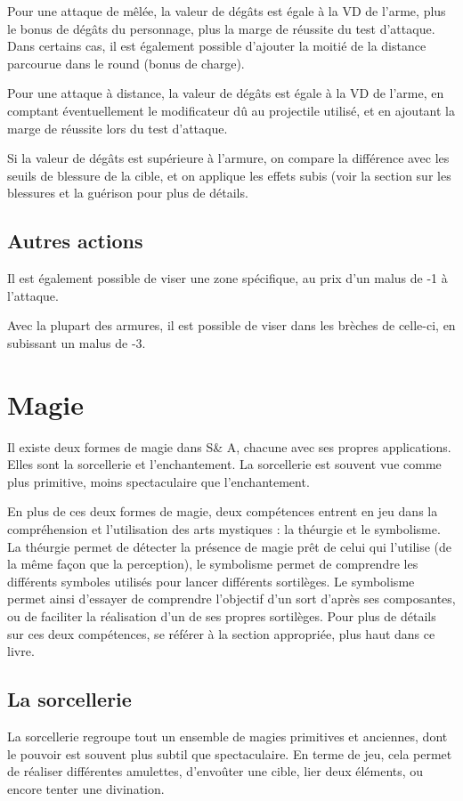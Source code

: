\documentclass[10pt,a4paper,twocolumn]{book}
\begin{document}
Pour une attaque de mêlée, la valeur de dégâts est égale à la VD de l'arme, plus le bonus de dégâts du personnage, plus la marge de réussite du test d'attaque. Dans certains cas, il est également possible d'ajouter la moitié de la distance parcourue dans le round (bonus de charge).

Pour une attaque à distance, la valeur de dégâts est égale à la VD de l'arme, en comptant éventuellement le modificateur dû au projectile utilisé, et en ajoutant la marge de réussite lors du test d'attaque.

Si la valeur de dégâts est supérieure à l'armure, on compare la différence avec les seuils de blessure de la cible, et on applique les effets subis (voir la section sur les blessures et la guérison pour plus de détails.
\section{Autres actions}

Il est également possible de viser une zone spécifique, au prix d’un malus de -1 à l’attaque.

Avec la plupart des armures, il est possible de viser dans les brèches de celle-ci, en subissant un malus de -3.

\chapter{Magie}
Il existe deux formes de magie dans S\& A, chacune avec ses propres applications. Elles sont la sorcellerie et l'enchantement. La sorcellerie est souvent vue comme plus primitive, moins spectaculaire que l'enchantement.

En plus de ces deux formes de magie, deux compétences entrent en jeu dans la compréhension et l'utilisation des arts mystiques : la théurgie et le symbolisme. La théurgie permet de détecter la présence de magie prêt de celui qui l'utilise (de la même façon que la perception), le symbolisme permet de comprendre les différents symboles utilisés pour lancer différents sortilèges. Le symbolisme permet ainsi d'essayer de comprendre l'objectif d'un sort d'après ses composantes, ou de faciliter la réalisation d'un de ses propres sortilèges. Pour plus de détails sur ces deux compétences, se référer à la section appropriée, plus haut dans ce livre.

\section{La sorcellerie}
La sorcellerie regroupe tout un ensemble de magies primitives et anciennes, dont le pouvoir est souvent plus subtil que spectaculaire. En terme de jeu, cela permet de réaliser différentes amulettes, d'envoûter une cible, lier deux éléments, ou encore tenter une divination.
\end{document}
